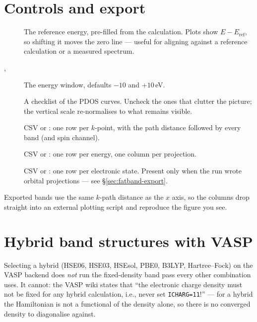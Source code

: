 \section{Controls and export}

\begin{description}
  \item[] The reference energy, pre-filled from the
    calculation. Plots show $E - E_\text{ref}$, so shifting it moves the
    zero line --- useful for aligning against a reference calculation or a
    measured spectrum.
  \item[, ] The energy window, defaults $-10$ and
    $+10$\,eV.
  \item[] A checklist of the PDOS curves. Uncheck the ones
    that clutter the picture; the vertical scale re-normalises to what
    remains visible.
  \item[] CSV or : one row per $k$-point,
    with the path distance followed by every band (and spin channel).
  \item[] CSV or : one row per energy, one
    column per projection.
  \item[] CSV or : one row per
    electronic state. Present only when the run wrote orbital projections
    --- see \S\ref{sec:fatband-export}.
\end{description}

\begin{calnote}
Exported bands use the same $k$-path distance as the $x$ axis, so the
columns drop straight into an external plotting script and reproduce the
figure you see.
\end{calnote}

\section{Hybrid band structures with VASP}
\label{sec:hybrid-bands}

Selecting a hybrid (HSE06, HSE03, HSEsol, PBE0, B3LYP, Hartree--Fock) on the
VASP backend does \emph{not} run the fixed-density band pass every other
combination uses. It cannot: the VASP wiki states that ``the electronic
charge density must not be fixed for any hybrid calculation, i.e., never set
\texttt{ICHARG=11}!'' --- for a hybrid the Hamiltonian is not a functional of
the density alone, so there is no converged density to diagonalise against.

